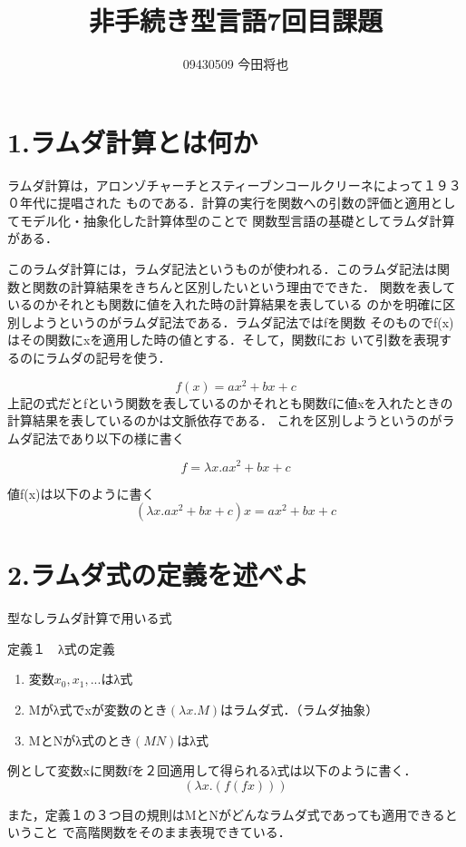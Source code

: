 \documentclass{jarticle}
\begin{document}
\title{非手続き型言語7回目課題}
\author{09430509 今田将也}
\maketitle

\section{1.ラムダ計算とは何か}

ラムダ計算は，アロンゾチャーチとスティーブンコールクリーネによって１９３０年代に提唱された
ものである．計算の実行を関数への引数の評価と適用としてモデル化・抽象化した計算体型のことで
関数型言語の基礎としてラムダ計算がある．

このラムダ計算には，ラムダ記法というものが使われる．このラムダ記法は関
数と関数の計算結果をきちんと区別したいという理由でできた．
関数を表しているのかそれとも関数に値を入れた時の計算結果を表している
のかを明確に区別しようというのがラムダ記法である．ラムダ記法ではfを関数
そのものでf(x)はその関数にxを適用した時の値とする．そして，関数fにお
いて引数を表現するのにラムダの記号を使う．

\begin{equation}
  f(x) = ax^2+bx+c
\end{equation}
上記の式だとfという関数を表しているのかそれとも関数fに値xを入れたときの
計算結果を表しているのかは文脈依存である．
これを区別しようというのがラムダ記法であり以下の様に書く

\begin{equation}
  f=λx.ax^2+bx+c
\end{equation}

値f(x)は以下のように書く
\begin{equation}
  (λx.ax^2+bx+c)x = ax^2+bx+c
\end{equation}

\section{2.ラムダ式の定義を述べよ}

型なしラムダ計算で用いる式

定義１　λ式の定義
\begin{enumerate}
\item 変数$x_0,x_1,...$はλ式
\item Mがλ式でxが変数のとき$(λx.M)$はラムダ式．（ラムダ抽象）
\item MとNがλ式のとき$(MN)$はλ式
\end{enumerate}

例として変数xに関数fを２回適用して得られるλ式は以下のように書く．
\begin{equation}
  (λx.(f(fx)))
\end{equation}

また，定義１の３つ目の規則はMとNがどんなラムダ式であっても適用できるということ
で高階関数をそのまま表現できている．
\end{document}
